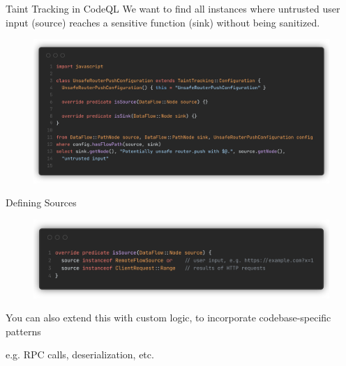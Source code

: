 \documentclass[aspectratio=169,xcolor=dvipsnames]{beamer}
\begin{document}
\begin{frame}{Taint Tracking in CodeQL}
	We want to find all instances where untrusted user input (source) reaches a
	sensitive function (sink) without being sanitized.

	\begin{figure}
		\includegraphics[height=0.7\textheight]{img/3.png}
	\end{figure}
\end{frame}

\begin{frame}{Defining Sources}

	\begin{figure}
		\includegraphics[width=\textwidth]{img/4.png}
	\end{figure}

	You can also extend this with custom logic, to incorporate codebase-specific
	patterns

	e.g. RPC calls, deserialization, etc.

\end{frame}
\end{document}
